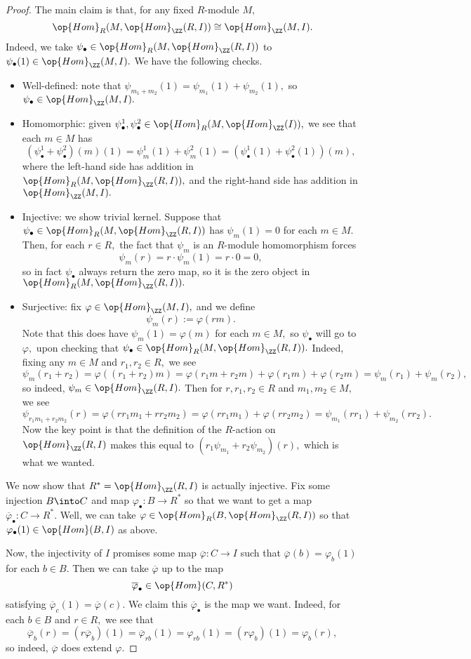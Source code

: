 \documentclass[../notes.tex]{subfiles}
\begin{document}
\begin{proof}
	The main claim is that, for any fixed $R$-module $M,$
	\[\op{Hom}_R(M,\op{Hom}_\ZZ(R,I))\cong\op{Hom}_\ZZ(M,I).\]
	Indeed, we take $\psi_\bullet\in\op{Hom}_R(M,\op{Hom}_\ZZ(R,I))$ to $\psi_\bullet(1)\in\op{Hom}_\ZZ(M,I).$ We have the following checks.
	\begin{itemize}
		\item Well-defined: note that $\psi_{m_1+m_2}(1)=\psi_{m_1}(1)+\psi_{m_2}(1),$ so $\psi_\bullet\in\op{Hom}_\ZZ(M,I).$
		\item Homomorphic: given $\psi^1_\bullet,\psi^2_\bullet\in\op{Hom}_R(M,\op{Hom}_\ZZ(I)),$ we see that each $m\in M$ has
		\[(\psi^1_\bullet+\psi^2_\bullet)(m)(1)=\psi^1_m(1)+\psi^2_m(1)=(\psi^1_\bullet(1)+\psi^2_\bullet(1))(m),\]
		where the left-hand side has addition in $\op{Hom}_R(M,\op{Hom}_\ZZ(R,I)),$ and the right-hand side has addition in $\op{Hom}_\ZZ(M,I).$
		\item Injective: we show trivial kernel. Suppose that $\psi_\bullet\in\op{Hom}_R(M,\op{Hom}_\ZZ(R,I))$ has $\psi_m(1)=0$ for each $m\in M.$ Then, for each $r\in R,$ the fact that $\psi_m$ is an $R$-module homomorphism forces
		\[\psi_m(r)=r\cdot\psi_m(1)=r\cdot0=0,\]
		so in fact $\psi_\bullet$ always return the zero map, so it is the zero object in $\op{Hom}_R(M,\op{Hom}_\ZZ(R,I)).$
		\item Surjective: fix $\varphi\in\op{Hom}_\ZZ(M,I),$ and we define
		\[\psi_m(r):=\varphi(rm).\]
		Note that this does have $\psi_m(1)=\varphi(m)$ for each $m\in M,$ so $\psi_\bullet$ will go to $\varphi,$ upon checking that $\psi_\bullet\in\op{Hom}_R(M,\op{Hom}_\ZZ(R,I)).$ Indeed, fixing any $m\in M$ and $r_1,r_2\in R,$ we see
		\[\psi_m(r_1+r_2)=\varphi((r_1+r_2)m)=\varphi(r_1m+r_2m)+\varphi(r_1m)+\varphi(r_2m)=\psi_m(r_1)+\psi_m(r_2),\]
		so indeed, $\psi_m\in\op{Hom}_\ZZ(R,I).$ Then for $r,r_1,r_2\in R$ and $m_1,m_2\in M,$ we see
		\[\psi_{r_1m_1+r_2m_2}(r)=\varphi(rr_1m_1+rr_2m_2)=\varphi(rr_1m_1)+\varphi(rr_2m_2)=\psi_{m_1}(rr_1)+\psi_{m_2}(rr_2).\]
		Now the key point is that the definition of the $R$-action on $\op{Hom}_\ZZ(R,I)$ makes this equal to $(r_1\psi_{m_1}+r_2\psi_{m_2})(r),$ which is what we wanted.
	\end{itemize}
	We now show that $R^*=\op{Hom}_\ZZ(R,I)$ is actually injective. Fix some injection $B\into C$ and map $\varphi_\bullet:B\to R^*$ so that we want to get a map $\overline\varphi_\bullet:C\to R^*.$ Well, we can take $\varphi\in\op{Hom}_R(B,\op{Hom}_\ZZ(R,I))$ so that $\varphi_\bullet(1)\in\op{Hom}(B,I)$ as above.

	Now, the injectivity of $I$ promises some map $\overline\varphi:C\to I$ such that $\overline\varphi(b)=\varphi_b(1)$ for each $b\in B.$ Then we can take $\overline\varphi$ up to the map
	\[\overline\varphi_\bullet\in\op{Hom}(C,R^*)\]
	satisfying $\overline\varphi_c(1)=\overline\varphi(c).$ We claim this $\overline\varphi_\bullet$ is the map we want. Indeed, for each $b\in B$ and $r\in R,$ we see that
	\[\overline\varphi_b(r)=(r\overline\varphi_b)(1)=\overline\varphi_{rb}(1)=\varphi_{rb}(1)=(r\varphi_b)(1)=\varphi_b(r),\]
	so indeed, $\overline\varphi$ does extend $\varphi.$
\end{proof}
\end{document}
